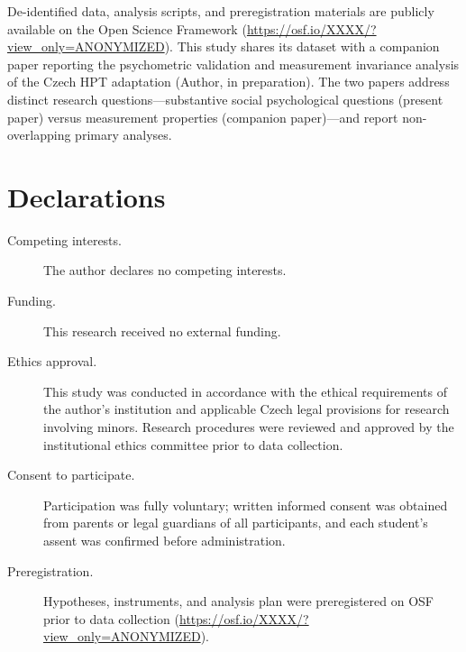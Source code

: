 \documentclass[referee,pdflatex,sn-apa]{sn-jnl}
\begin{document}
De-identified data, analysis scripts, and preregistration materials are publicly available on the Open Science Framework (\url{https://osf.io/XXXX/?view_only=ANONYMIZED}). This study shares its dataset with a companion paper reporting the psychometric validation and measurement invariance analysis of the Czech HPT adaptation (Author, in preparation). The two papers address distinct research questions---substantive social psychological questions (present paper) versus measurement properties (companion paper)---and report non-overlapping primary analyses.

\backmatter

\section*{Declarations}

\begin{description}
\item[Competing interests.] The author declares no competing interests.
\item[Funding.] This research received no external funding.
\item[Ethics approval.] This study was conducted in accordance with the ethical requirements of the author's institution and applicable Czech legal provisions for research involving minors. Research procedures were reviewed and approved by the institutional ethics committee prior to data collection.
\item[Consent to participate.] Participation was fully voluntary; written informed consent was obtained from parents or legal guardians of all participants, and each student's assent was confirmed before administration.
\item[Preregistration.] Hypotheses, instruments, and analysis plan were preregistered on OSF prior to data collection (\url{https://osf.io/XXXX/?view_only=ANONYMIZED}).
\end{description}


\end{document}
